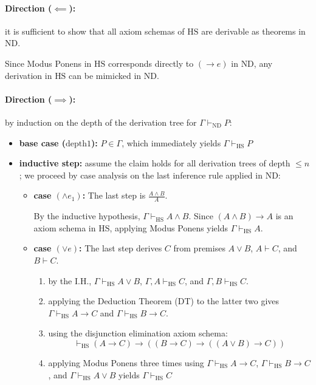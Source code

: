 \documentclass[a4paper, 11pt]{report}
\begin{document}
\begin{proofframe}{}{}
    \vspace{-1em}
\paragraph{Direction ($\impliedby$):} it is sufficient to show that all axiom schemas of $\text{HS}$ are derivable as theorems in $\text{ND}$. 
        
        Since Modus Ponens in $\text{HS}$ corresponds directly to $(\to e)$ in $\text{ND}$, any derivation in $\text{HS}$ can be mimicked in $\text{ND}$.
    
    \vspace{-1em}
    \paragraph{Direction ($\implies$):} by induction on the depth of the derivation tree for $\Gamma \vdash_{\text{ND}} P$:
    \begin{itemize}
        \item \textbf{base case ($\text{depth} 1$):} $P \in \Gamma$, which immediately yields $\Gamma \vdash_{\text{HS}} P$
        \item \textbf{inductive step:} assume the claim holds for all derivation trees of depth $\le n$; we proceed by case analysis on the last inference rule applied in $\text{ND}$:
        
        \begin{itemize}
            \item \textbf{case $(\wedge e_1)$:} The last step is $\frac{A \wedge B}{A}$. 

                By the inductive hypothesis, $\Gamma \vdash_{\text{HS}} A \wedge B$. Since $(A \wedge B) \to A$ is an axiom schema in $\text{HS}$, applying Modus Ponens yields $\Gamma \vdash_{\text{HS}} A$.
            
            \item \textbf{case $(\vee e)$:} The last step derives $C$ from premises $A \vee B$, $A \vdash C$, and $B \vdash C$.
            \begin{enumerate}
                \item by the I.H., $\Gamma \vdash_{\text{HS}} A \vee B$, $\Gamma, A \vdash_{\text{HS}} C$, and $\Gamma, B \vdash_{\text{HS}} C$.
                \item applying the Deduction Theorem (DT) to the latter two gives $\Gamma \vdash_{\text{HS}} A \to C$ and $\Gamma \vdash_{\text{HS}} B \to C$.
                \item using the disjunction elimination axiom schema:
                \[
                    \vdash_{\text{HS}} (A \to C) \to ((B \to C) \to ((A \vee B) \to C))
                \]
                \item applying Modus Ponens three times using $\Gamma \vdash_{\text{HS}} A \to C$, $\Gamma \vdash_{\text{HS}} B \to C$, and $\Gamma \vdash_{\text{HS}} A \vee B$ yields $\Gamma \vdash_{\text{HS}} C$
            \end{enumerate}
        \end{itemize}
\end{itemize}
\end{proofframe}
\end{document}
